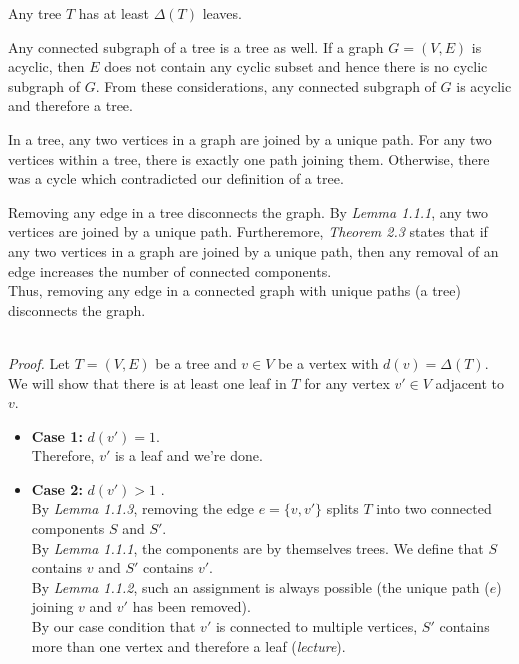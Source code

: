 \documentclass[a4paper]{article}
\begin{document}
\begin{solution}{1}
\begin{theorem}{Any tree $T$ has at least $\Delta(T)$ leaves.}
			\begin {lemma}{Any connected subgraph of a tree is a tree as well.}
				If a graph $G = (V, E)$ is acyclic, then $E$ does not contain any cyclic subset and hence there is no cyclic subgraph of $G$. From these considerations, any connected subgraph of $G$ is acyclic and therefore a tree.
			\end{lemma}

			\begin {lemma}{In a tree, any two vertices in a graph are joined by a unique path.}
				For any two vertices within a tree, there is exactly one path joining them. Otherwise, there was a cycle which contradicted our definition of a tree.
			\end{lemma}

			\begin {lemma}{Removing any edge in a tree disconnects the graph.}
				By \emph{Lemma 1.1.1}, any two vertices are joined by a unique path. Furtheremore, \emph{Theorem 2.3} states that if any two vertices in a graph are joined by a unique path, then any removal of an edge increases the number of connected components.\\
				Thus, removing any edge in a connected graph with unique paths (a tree) disconnects the graph.
			\end{lemma}
			\ \\
			\emph{Proof.} Let $T = (V, E)$ be a tree and $v \in V$ be a vertex with $d(v) = \Delta(T)$. We will show that there is at least one leaf in $T$ for any vertex $v' \in V$ adjacent to $v$.
			\begin{itemize}
				\item \textbf{Case 1: } $d(v') = 1$.\\
					Therefore, $v'$ is a leaf and we're done.
				\item \textbf{Case 2: } $d(v') > 1$ .\\
					By \emph{Lemma 1.1.3}, removing the edge $e = \{v, v'\}$ splits $T$ into two connected components $S$ and $S'$.\\
					By  \emph{Lemma 1.1.1}, the components are by themselves trees. We define that $S$ contains $v$ and $S'$ contains $v'$.\\
					By \emph{Lemma 1.1.2}, such an assignment is always possible (the unique path ($e$) joining $v$ and $v'$ has been removed).\\
				By our case condition that $v'$ is connected to multiple vertices, $S'$ contains more than one vertex and therefore a leaf (\emph{lecture}).\\ \ \\

\end{itemize}
\end{theorem}
\end{solution}
\end{document}

